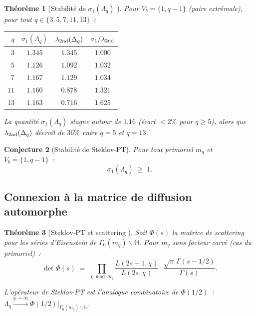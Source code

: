 \documentclass[11pt,a4paper]{article}
\newtheorem{theorem}{Théorème}[section]
\newtheorem{conjecture}[theorem]{Conjecture}
\theoremstyle{definition}
\newcommand{\Hilb}{\mathbb{H}}
\begin{document}
\begin{theorem}[Stabilité de $\sigma_1(\Lambda_q)$ {}]
\label{thm:steklov_stability}
Pour $V_b = \{1, q-1\}$ (paire extrémale), pour tout $q\in\{3,5,7,11,13\}$~:
\begin{center}
\renewcommand{\arraystretch}{1.2}
\begin{tabular}{rccc}
\toprule
$q$ & $\sigma_1(\Lambda_q)$ & $\lambda_{\rm 2nd}(\Delta_q)$ &
$\sigma_1/\lambda_{\rm 2nd}$ \\
\midrule
$3$  & $1.345$ & $1.345$ & $1.000$ \\
$5$  & $1.126$ & $1.092$ & $1.032$ \\
$7$  & $1.167$ & $1.129$ & $1.034$ \\
$11$ & $1.160$ & $0.878$ & $1.321$ \\
$13$ & $1.163$ & $0.716$ & $1.625$ \\
\bottomrule
\end{tabular}
\end{center}
La quantité $\sigma_1(\Lambda_q)$ \emph{stagne} autour de $1.16$
(écart $<2\%$ pour $q\geq 5$), \emph{alors que}
$\lambda_{\rm 2nd}(\Delta_q)$ \emph{décroît} de $36\%$ entre $q=5$
et $q=13$.
\end{theorem}

\begin{conjecture}[Stabilité de Steklov-PT]
\label{conj:steklov_pt}
Pour tout primoriel $m_q$ et $V_b = \{1,q-1\}$~:
\begin{equation}
  \sigma_1(\Lambda_q) \;\geq\; 1.
\end{equation}
\end{conjecture}

\subsection{Connexion à la matrice de diffusion automorphe}

\begin{theorem}[Steklov-PT et scattering {\upshape [PROP]}]
\label{thm:steklov_scattering}
Soit $\Phi(s)$ la matrice de scattering pour les séries d'Eisenstein
de $\Gamma_0(m_q)\backslash\Hilb$. Pour $m_q$ sans facteur carré
(cas du primoriel)~:
\begin{equation}
  \det\Phi(s) \;=\;
  \prod_{\chi\bmod m_q} \frac{L(2s-1,\chi)}{L(2s,\chi)} \cdot
  \frac{\sqrt\pi\,\Gamma(s-1/2)}{\Gamma(s)}.
\end{equation}

L'opérateur de Steklov-PT est l'\emph{analogue combinatoire} de
$\Phi(1/2)$~:
$\Lambda_q \xrightarrow{q\to\infty}
\Phi(1/2)\big|_{\Gamma_0(m_q)\backslash\Hilb}$.
\end{theorem}
\end{document}
